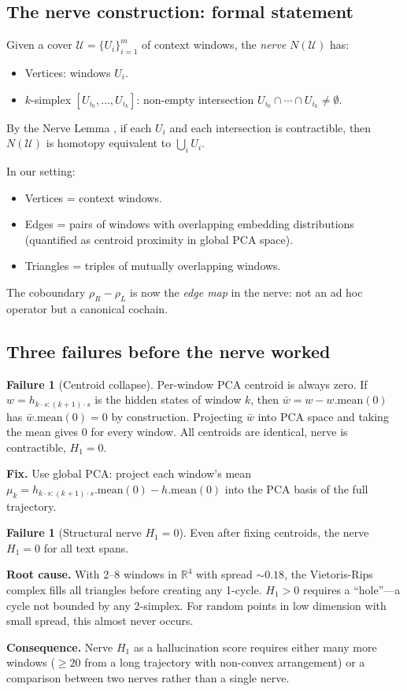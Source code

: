 \documentclass[11pt]{amsart}
\theoremstyle{definition}
\newtheorem{failure}[theorem]{Failure}
\begin{document}
\subsection{The nerve construction: formal statement}

Given a cover $\mathcal{U} = \{U_i\}_{i=1}^m$ of context windows, the
\emph{nerve} $N(\mathcal{U})$ has:
\begin{itemize}
\item Vertices: windows $U_i$.
\item $k$-simplex $[U_{i_0}, \ldots, U_{i_k}]$: non-empty intersection
$U_{i_0} \cap \cdots \cap U_{i_k} \neq \emptyset$.
\end{itemize}
By the Nerve Lemma \cite{Borsuk48}, if each $U_i$ and each intersection is
contractible, then $N(\mathcal{U})$ is homotopy equivalent to $\bigcup_i U_i$.

In our setting:
\begin{itemize}
\item Vertices = context windows.
\item Edges = pairs of windows with overlapping embedding distributions
      (quantified as centroid proximity in global PCA space).
\item Triangles = triples of mutually overlapping windows.
\end{itemize}
The coboundary $\rho_R - \rho_L$ is now the \emph{edge map} in the nerve:
not an ad hoc operator but a canonical cochain.

\subsection{Three failures before the nerve worked}

\begin{failure}[Centroid collapse]
Per-window PCA centroid is always zero.
If $w = h_{k\cdot s:(k+1)\cdot s}$ is the hidden states of window $k$,
then $\bar{w} = w - w.\mathrm{mean}(0)$ has $\bar{w}.\mathrm{mean}(0) = 0$ by construction.
Projecting $\bar{w}$ into PCA space and taking the mean gives $0$ for every window.
All centroids are identical, nerve is contractible, $H_1 = 0$.

\textbf{Fix.} Use global PCA: project each window's mean $\mu_k = h_{k \cdot s:(k+1)\cdot s}.\mathrm{mean}(0) - h.\mathrm{mean}(0)$ into the PCA basis of the full trajectory.
\end{failure}

\begin{failure}[Structural nerve $H_1 = 0$]
Even after fixing centroids, the nerve $H_1 = 0$ for all text spans.

\textbf{Root cause.} With 2--8 windows in $\mathbb{R}^4$ with spread $\sim 0.18$,
the Vietoris-Rips complex fills all triangles before creating any 1-cycle.
$H_1 > 0$ requires a ``hole''---a cycle not bounded by any 2-simplex.
For random points in low dimension with small spread, this almost never occurs.

\textbf{Consequence.} Nerve $H_1$ as a hallucination score requires either
many more windows ($\geq 20$ from a long trajectory with non-convex arrangement)
or a comparison between two nerves rather than a single nerve.
\end{failure}
\end{document}
